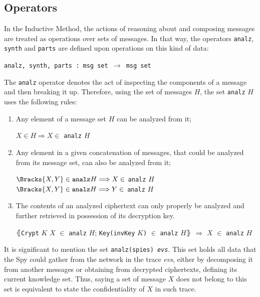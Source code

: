\subsection{Operators}
In the Inductive Method, the actions of reasoning about and composing messages are treated as operations over sets of messages. In that way, the operators \texttt{analz}, \texttt{synth} and \texttt{parts} are defined upon operations on this kind of data:

\begin{center}
  \texttt{analz, synth, parts : msg set $\longrightarrow$ msg set}
\end{center}

The \texttt{analz} operator denotes the act of inspecting the components of a message and then breaking it up. Therefore, using the set of messages $H$, the set \texttt{analz} $H$ uses the following rules:

\begin{enumerate}
  \item Any element of a message set $H$ can be analyzed from it;
  \begin{center}
    $X \in H \Longrightarrow X \in$ \texttt{analz} $H$
  \end{center}

  \item Any element in a given concatenation of messages, that could be analyzed from its message set, can also be analyzed from it;
  \begin{center}
    $\Bracks{X,Y} \in \texttt{analz} H \Longrightarrow X \in$ \texttt{analz} $H$ \\
    $\Bracks{X,Y} \in \texttt{analz} H \Longrightarrow Y \in$ \texttt{analz} $H$
  \end{center}

  \item The contents of an analyzed ciphertext can only properly be analyzed and further retrieved in possession of its decryption key.
  \begin{center}
    $\lBrace$\texttt{Crypt} $K$ $X$ $\in$ \texttt{analz} $H$; \texttt{Key(invKey} $K$\texttt{)} $\in$ \texttt{analz} $H\rBrace$ $\Longrightarrow$ $X$ $\in$ \texttt{analz} $H$
  \end{center}
\end{enumerate}

It is significant to mention the set \texttt{analz(spies) \textit{evs}}. This set holds all data that the Spy could gather from the network in the trace \textit{evs}, either by decomposing it from another messages or obtaining from decrypted ciphertexts, defining its current knowledge set. Thus, saying a set of message $X$ does not belong to this set is equivalent to state the confidentiality of $X$ in such trace.


